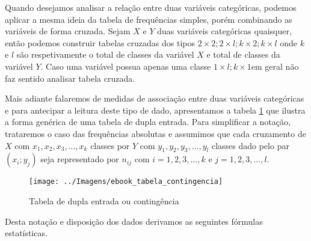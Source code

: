 \documentclass[11pt,]{style/krantz}
\theoremstyle{definition}
\theoremstyle{definition}
\theoremstyle{definition}
\theoremstyle{remark}
\begin{document}
Quando desejamos analisar a relação entre duas variáveis categóricas, podemos aplicar a mesma ideia da tabela de frequências simples, porém combinando as variáveis de forma cruzada. Sejam \(X\) e \(Y\) duas variáveis categóricas quaisquer, então podemos construir tabelas cruzadas dos tipos \(2 \times 2; 2 \times l; k \times 2;k \times l\) onde \(k\) e \(l\) são respetivamente o total de classes da variável \(X\) e total de classes da variável \(Y\). Caso uma variável possua apenas uma classe \(1 \times l; k \times 1\)em geral não faz sentido analisar tabela cruzada.

Mais adiante falaremos de medidas de associação entre duas variáveis categóricas e para antecipar a leitura deste tipo de dado, apresentamos a tabela \ref{fig:figtf} que ilustra a forma genérica de uma tabela de dupla entrada. Para simplificar a notação, trataremos o caso das frequências absolutas e assumimos que cada cruzamento de \(X\) com \(x_1,x_2,x_3,...,x_k\) classes por \(Y\) com \(y_1,y_2,y_3,...,y_l\) classes dado pelo par \((x_i;y_j)\) seja representado por \(n_{ij}\) com \(i=1,2,3,...,k\) e \(j=1,2,3,...,l\).

\begin{figure}[H]

{\centering \texttt{[image: ../Imagens/ebook\_tabela\_contingencia]}

}

\caption{Tabela de dupla entrada ou contingência}\label{fig:figtf}
\end{figure}

Desta notação e disposição dos dados derivamos as seguintes fórmulas estatísticas.
\end{document}

